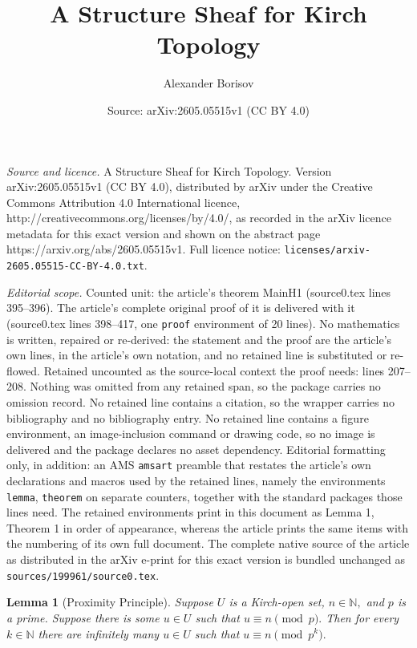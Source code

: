 \documentclass[10pt,a4paper]{amsart}
\title{A Structure Sheaf for Kirch Topology}
\author{Alexander Borisov}
\date{Source: arXiv:2605.05515v1 (CC BY 4.0)}
\newtheorem{lemma}{Lemma}
\begin{document}
\maketitle

\noindent\emph{Source and licence.} A Structure Sheaf for Kirch Topology. Version arXiv:2605.05515v1 (CC BY 4.0), distributed by arXiv under the Creative Commons Attribution 4.0 International licence, http://creativecommons.org/licenses/by/4.0/, as recorded in the arXiv licence metadata for this exact version and shown on the abstract page https://arxiv.org/abs/2605.05515v1. Full licence notice: \texttt{licenses/arxiv-2605.05515-CC-BY-4.0.txt}.\par\smallskip

\noindent\textit{Editorial scope.} Counted unit: the article's theorem MainH1 (source0.tex lines 395--396). The article's complete original proof of it is delivered with it (source0.tex lines 398--417, one \texttt{proof} environment of 20 lines). No mathematics is written, repaired or re-derived: the statement and the proof are the article's own lines, in the article's own notation, and no retained line is substituted or re-flowed.  Retained uncounted as the source-local context the proof needs: lines 207--208.  Nothing was omitted from any retained span, so the package carries no omission record.  No retained line contains a citation, so the wrapper carries no bibliography and no bibliography entry.  No retained line contains a figure environment, an image-inclusion command or drawing code, so no image is delivered and the package declares no asset dependency.  Editorial formatting only, in addition: an AMS \texttt{amsart} preamble that restates the article's own declarations and macros used by the retained lines, namely the environments \texttt{lemma}, \texttt{theorem} on separate counters, together with the standard packages those lines need.  The retained environments print in this document as Lemma 1, Theorem 1 in order of appearance, whereas the article prints the same items with the numbering of its own full document.  The complete native source of the article as distributed in the arXiv e-print for this exact version is bundled unchanged as \texttt{sources/199961/source0.tex}.
\begin{lemma}[Proximity Principle] \label{PP} Suppose $U$ is a Kirch-open set, $n\in \mathbb N,$ and $p$ is a prime. Suppose there is some $u\in U$ such that $u \equiv n \pmod p.$ Then for every $k\in \mathbb N$ there are infinitely many $u \in U$ such that $u \equiv n \pmod{p^k}.$
\end{lemma}
\end{document}
